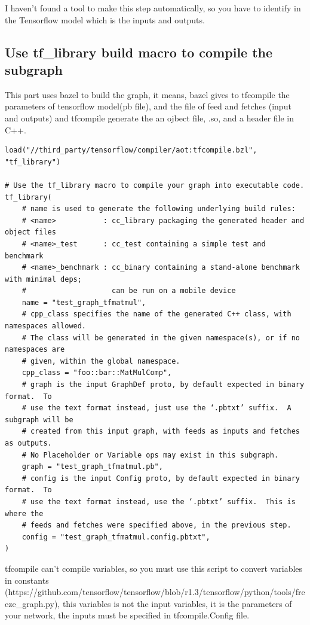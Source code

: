 \documentclass[11pt,openany]{book}
\begin{document}
I haven't found a tool to make this step automatically, so you have to identify in the Tensorflow model which is the inputs and outputs.

\subsection{Use tf\_library build macro to compile the subgraph}

This part uses bazel to build the graph, it means, bazel gives to tfcompile the parameters of tensorflow model(pb file), and the file of feed and fetches (input and outputs) and tfcompile generate the an ojbect file, .so, and a header file in C++.

\begin{verbatim}
load("//third_party/tensorflow/compiler/aot:tfcompile.bzl", "tf_library")

# Use the tf_library macro to compile your graph into executable code.
tf_library(
    # name is used to generate the following underlying build rules:
    # <name>           : cc_library packaging the generated header and object files
    # <name>_test      : cc_test containing a simple test and benchmark
    # <name>_benchmark : cc_binary containing a stand-alone benchmark with minimal deps;
    #                    can be run on a mobile device
    name = "test_graph_tfmatmul",
    # cpp_class specifies the name of the generated C++ class, with namespaces allowed.
    # The class will be generated in the given namespace(s), or if no namespaces are
    # given, within the global namespace.
    cpp_class = "foo::bar::MatMulComp",
    # graph is the input GraphDef proto, by default expected in binary format.  To
    # use the text format instead, just use the ‘.pbtxt’ suffix.  A subgraph will be
    # created from this input graph, with feeds as inputs and fetches as outputs.
    # No Placeholder or Variable ops may exist in this subgraph.
    graph = "test_graph_tfmatmul.pb",
    # config is the input Config proto, by default expected in binary format.  To
    # use the text format instead, use the ‘.pbtxt’ suffix.  This is where the
    # feeds and fetches were specified above, in the previous step.
    config = "test_graph_tfmatmul.config.pbtxt",
)
\end{verbatim}

tfcompile can't compile variables, so you must use this script to convert variables in constants (https://github.com/tensorflow/tensorflow/blob/r1.3/tensorflow/python/tools/freeze_graph.py), this variables is not the input variables, it is the parameters of your network, the inputs must be specified in tfcompile.Config file.
\end{document}
